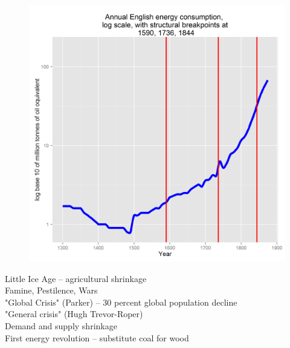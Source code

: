 \documentclass[final]{beamer}
\begin{document}
\begin{frame}
\begin{figure}[p!]
{		\mbox{\includegraphics[height=0.5\textheight]{energyLog1}}
		}
		\end{figure} \vspace*{-0.4in}
Little Ice Age -- agricultural shrinkage\\
Famine, Pestilence, Wars\\
"Global Crisis" (Parker) -- 30 percent global population decline\\
"General crisis" (Hugh Trevor-Roper)\\
Demand and supply shrinkage\\
First energy revolution -- substitute coal for wood\\
\end{frame}
\end{document}
